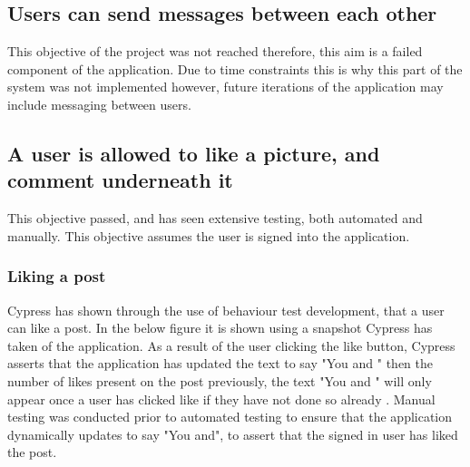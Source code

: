 \subsection{Users can send messages between each other}
This objective of the project was not reached therefore, this aim is a failed component of the application. Due to time constraints this is why this part of the system was not implemented however, future iterations of the application may include messaging between users.

\subsection{A user is allowed to like a picture, and comment underneath it}
This objective passed, and has seen extensive testing, both automated and manually. This objective assumes the user is signed into the application.

\subsubsection{Liking a post}
Cypress has shown through the use of behaviour test development, that a user can like a post. In the below figure it is shown using a snapshot Cypress has taken of the application. As a result of the user clicking the like button, Cypress asserts that the application has updated the text to say "You and " then the number of likes present on the post previously, the text "You and " will only appear once a user has clicked like if they have not done so already . Manual testing was conducted prior to automated testing to ensure that the application dynamically updates to say "You and", to assert that the signed in user has liked the post.

